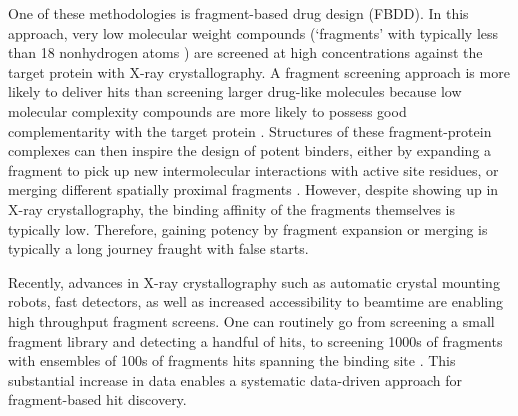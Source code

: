 One of these methodologies is fragment-based drug design (FBDD). In this approach, very low molecular weight compounds (`fragments' with typically less than 18 nonhydrogen atoms \cite{David2017FBLD}) are screened at high concentrations against the target protein with X-ray crystallography. A fragment screening approach is more likely to deliver hits than screening larger drug-like molecules because low molecular complexity compounds are more likely to possess good complementarity with the target protein \cite{hann2001molecular}. Structures of these fragment-protein complexes can then inspire the design of potent binders, either by expanding a fragment to pick up new intermolecular interactions with active site residues, or merging different spatially proximal fragments \cite{Ichihara2011FragLinking, Yu2021FragLinkingEntropy}. However, despite showing up in X-ray crystallography, the binding affinity of the fragments themselves is typically low. Therefore, gaining potency by fragment expansion or merging is typically a long journey fraught with false starts. 



Recently, advances in X-ray crystallography such as automatic crystal mounting robots, fast detectors, as well as increased accessibility to beamtime are enabling high throughput fragment screens. One can routinely go from screening a small fragment library and detecting a handful of hits, to screening 1000s of fragments with ensembles of 100s of fragments hits spanning the binding site \cite{Schiebel2016HighThroughput, Douangamath2020XChem}. This substantial increase in data enables a systematic data-driven approach for fragment-based hit discovery. 


